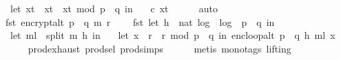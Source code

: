 \begin{isabellebody}
\ \ let\ x{\isacharunderscore}{\kern0pt}t{\isacharprime}{\kern0pt}\ {\isacharequal}{\kern0pt}\ x{\isacharunderscore}{\kern0pt}t\ {\isacharasterisk}{\kern0pt}\ x{\isacharunderscore}{\kern0pt}t\ mod\ {\isacharparenleft}{\kern0pt}p\ {\isacharasterisk}{\kern0pt}\ q{\isacharparenright}{\kern0pt}\ in\ \isanewline
\ \ {\isacharparenleft}{\kern0pt}c{\isacharcomma}{\kern0pt}\ x{\isacharunderscore}{\kern0pt}t{\isacharprime}{\kern0pt}{\isacharparenright}{\kern0pt}{\isacharparenright}{\kern0pt}{\isachardoublequoteclose}\isanewline
\ \ \ \ \isamarkupfalse%
\ auto\isanewline
\ \ \isamarkupfalse%
\ \isamarkupfalse%
\ {\isachardoublequoteopen}fst\ {\isacharparenleft}{\kern0pt}encrypt{\isacharunderscore}{\kern0pt}alt\ {\isacharparenleft}{\kern0pt}p\ {\isacharasterisk}{\kern0pt}\ q{\isacharparenright}{\kern0pt}\ m\ r{\isacharparenright}{\kern0pt}\ \isanewline
\ \ {\isacharequal}{\kern0pt}\ fst\ {\isacharparenleft}{\kern0pt}let\ h\ {\isacharequal}{\kern0pt}\ nat\ {\isasymlfloor}log\ {}\ {\isacharparenleft}{\kern0pt}log\ {}\ {\isacharparenleft}{\kern0pt}p\ {\isacharasterisk}{\kern0pt}\ q{\isacharparenright}{\kern0pt}{\isacharparenright}{\kern0pt}{\isasymrfloor}\ in\ \isanewline
\ \ let\ m{\isacharunderscore}{\kern0pt}l\ {\isacharequal}{\kern0pt}\ split\ m\ h\ in\ \isanewline
\ \ let\ x{\isacharunderscore}{\kern0pt}{}\ {\isacharequal}{\kern0pt}\ {\isacharparenleft}{\kern0pt}r\ {\isacharasterisk}{\kern0pt}\ r{\isacharparenright}{\kern0pt}\ mod\ {\isacharparenleft}{\kern0pt}p\ {\isacharasterisk}{\kern0pt}\ q{\isacharparenright}{\kern0pt}\ in\ enc{\isacharunderscore}{\kern0pt}loop{\isacharunderscore}{\kern0pt}alt\ {\isacharparenleft}{\kern0pt}p\ {\isacharasterisk}{\kern0pt}\ q{\isacharcomma}{\kern0pt}\ h{\isacharcomma}{\kern0pt}\ m{\isacharunderscore}{\kern0pt}l{\isacharparenright}{\kern0pt}\ x{\isacharunderscore}{\kern0pt}{}{\isacharparenright}{\kern0pt}{\isachardoublequoteclose}\ \isanewline
\ \ \ \ \isamarkupfalse%
\ prod{\isachardot}{\kern0pt}exhaust\ prod{\isachardot}{\kern0pt}sel{\isacharparenleft}{\kern0pt}{}{\isacharparenright}{\kern0pt}\ prod{\isachardot}{\kern0pt}simps{\isacharparenleft}{\kern0pt}{}{\isacharparenright}{\kern0pt}\isanewline
\ \ \ \ \isamarkupfalse%
\ {\isacharparenleft}{\kern0pt}metis\ {\isacharparenleft}{\kern0pt}mono{\isacharunderscore}{\kern0pt}tags{\isacharcomma}{\kern0pt}\ lifting{\isacharparenright}{\kern0pt}{\isacharparenright}{\kern0pt}\isanewline
\isanewline
\ \ \isamarkupfalse%

\end{isabellebody}
